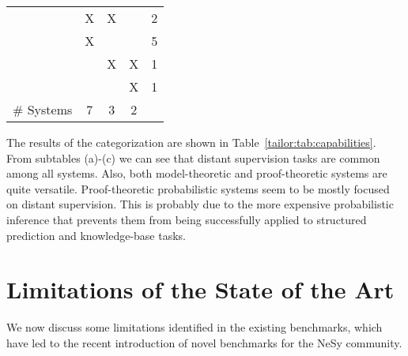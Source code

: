 \begin{table}[ht!]
\begin{subtable}[t]{0.32\linewidth}
\begin{tabular}{@{}c|ccc|r@{}}
    & X       & X      &        & 2               \\
    & X       &        &        & 5               \\
      &      & X      & X      & 1               \\
&            &        & X      & 1               \\ \midrule
 \# Systems &    7       & 3      & 2      &                 \\ \bottomrule
    \end{tabular}
    \end{subtable}
\end{table}

The results of the categorization are shown in Table~\ref{tailor:tab:capabilities}. From subtables (a)-(c) we can see that distant supervision tasks are common among all systems. Also, both model-theoretic and proof-theoretic systems are quite versatile. Proof-theoretic probabilistic systems seem to be mostly focused on distant supervision. This is probably due to the more expensive probabilistic inference that prevents them from being successfully applied to structured prediction and knowledge-base tasks.


\section{Limitations of the State of the Art}
We now discuss some limitations identified in the existing benchmarks, which have led to the recent introduction of novel benchmarks for the NeSy community.

